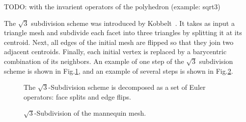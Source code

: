 TODO: with the invarient operators of the polyhedron (example: sqrt3)

The $\sqrt{3}$ subdivision scheme was introduced by
Kobbelt~\cite{k-sqrt3-00}. It takes as input a triangle mesh and
subdivide each facet into three triangles by splitting it at its
centroid. Next, all edges of the initial mesh are flipped so that they
join two adjacent centroids. Finally, each initial vertex is replaced
by a barycentric combination of its neighbors. An example of one step
of the $\sqrt{3}$ subdivision scheme is shown in
Fig.\ref{fig:sqrt3_basic}, and an example of several steps is shown in
Fig.\ref{fig:sqrt3}.

\begin{figure}[htb]
    \caption{The $\sqrt{3}$-Subdivision scheme is decomposed as
             a set of Euler operators: face splits and edge flips.}
    \label{fig:sqrt3_basic}
\end{figure}

\begin{figure}[htb]
    \caption{$\sqrt{3}$-Subdivision of the mannequin mesh.}
    \label{fig:sqrt3}
\end{figure}
